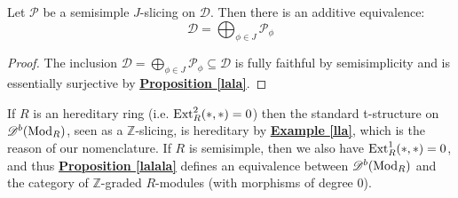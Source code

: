 \begin{prop}\label{lalala}
Let $\mathscr{P}$ be a semisimple $J$-slicing on $\mathscr{D}$. Then there is an additive equivalence: $$\mathscr{D}=\bigoplus_{\phi \in J} \mathscr{P}_{\phi}$$
\end{prop}

\begin{proof}
The inclusion $\mathscr{D}=\bigoplus_{\phi \in J} \mathscr{P}_{\phi} \subseteq \mathscr{D}$ is fully faithful by semisimplicity and is essentially surjective by \hyperref[lala]{\textbf{Proposition \ref*{lala}}}.
\end{proof}

\begin{exmp}\label{trala}
If $R$ is an hereditary ring (i.e. $\textnormal{Ext}_R^2(*,*)=0$) then the standard t-structure on $\mathscr{D}^b(\textnormal{Mod}_R)$, seen as a $\mathbb{Z}$-slicing, is hereditary by \hyperref[lla]{\textbf{Example \ref*{lla}}}, which is the reason of our nomenclature. If $R$ is semisimple, then we also have $\textnormal{Ext}_R^1(*,*)=0$, and thus \hyperref[lalala]{\textbf{Proposition \ref*{lalala}}} defines an equivalence between $\mathscr{D}^b(\textnormal{Mod}_R)$ and the category of $\mathbb{Z}$-graded $R$-modules (with morphisms of degree $0$). 
\end{exmp}

